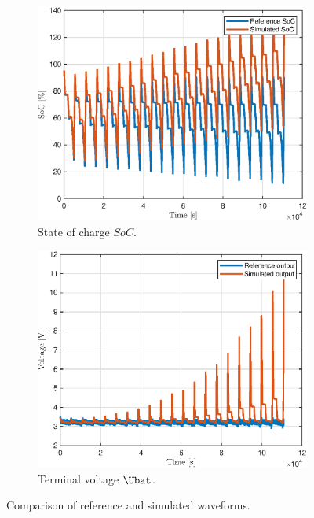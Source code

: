 \begin{figure}[hbp]
    \centering
\begin{subfigure}{0.49\textwidth}
    \centering
    \includegraphics[width=\textwidth]{figures/9/validation-soc.eps}
    \caption{State of charge $SoC$.}
    \label{fig:9-validation-SOC}
    \end{subfigure}
    \hfill
    \begin{subfigure}{0.49\textwidth}
    \centering
    \includegraphics[width=\textwidth]{figures/9/validation-U.eps}
    \caption{Terminal voltage $\Ubat$.}
    \label{fig:9-validation-U}
    \end{subfigure}
    
    \caption{Comparison of reference and simulated waveforms.}
    \label{fig:9-validation}
\end{figure}

